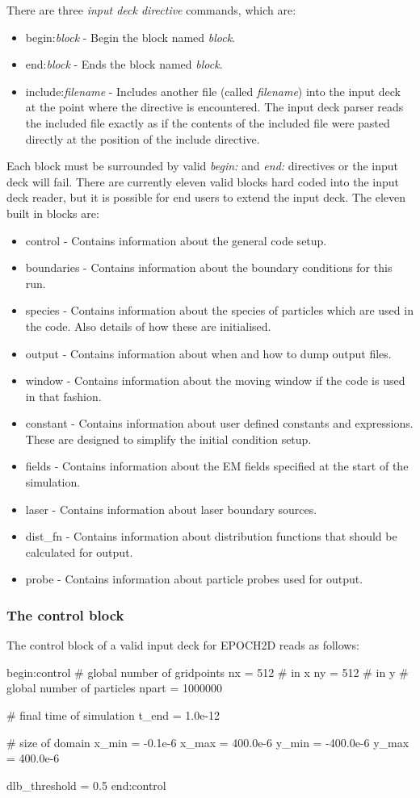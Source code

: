 There are three {\it input deck directive} commands, which are:
\begin{itemize}
\item begin:{\it block} - Begin the block named {\it block}.
\item end:{\it block} - Ends the block named {\it block}.
\item include:{\it filename} - Includes another file (called {\it filename})
  into the input deck at the point where the directive is encountered. The
  input deck parser reads the included file exactly as if the contents of the
  included file were pasted directly at the position of the include directive.
\end{itemize}
Each block must be surrounded by valid {\it begin:} and {\it end:} directives
or the input deck will fail. There are currently eleven valid blocks hard
coded into the input deck reader, but it is possible for end users to extend
the input deck. The eleven built in blocks are:
\begin{itemize}
\item control - Contains information about the general code setup.
\item boundaries - Contains information about the boundary conditions for this
  run.
\item species - Contains information about the species of particles which are
  used in the code. Also details of how these are initialised.
\item output - Contains information about when and how to dump output files.
\item window - Contains information about the moving window if the code is
  used in that fashion.
\item constant - Contains information about user defined constants and
  expressions. These are designed to simplify the initial condition setup.
\item fields - Contains information about the EM fields specified at the
  start of the simulation.
\item laser - Contains information about laser boundary sources.
\item dist\_fn - Contains information about distribution functions that should
  be calculated for output.
\item probe - Contains information about particle probes used for output.
\end{itemize}

\subsubsection{The control block}
The control block of a valid input deck for EPOCH2D reads as follows:
\begin{boxverbatim}
begin:control
   # global number of gridpoints
   nx = 512 # in x
   ny = 512 # in y
   # global number of particles
   npart = 1000000

   # final time of simulation
   t_end = 1.0e-12

   # size of domain
   x_min = -0.1e-6
   x_max = 400.0e-6
   y_min = -400.0e-6
   y_max = 400.0e-6

   dlb_threshold = 0.5
end:control
\end{boxverbatim}

